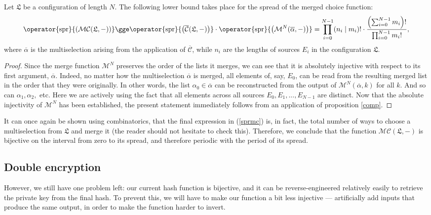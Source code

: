 \documentclass[12pt, a4paper]{article}
\renewcommand{\C}{\mathcal{C}}
\newcommand{\CC}{\overline{\mathcal{C}}}
\newcommand{\M}{\mathcal{M}}
\newcommand{\conf}{\mathfrak{L}}
\newcommand{\spr}[1]{\operator{\mathrm{spr}}{\left(#1\right)}}
\begin{document}
\begin{proposition}
    Let $ \conf $ be a configuration of length $ N $. The following lower bound takes place for the spread of the merged choice function:
    \begin{equation}\label{sprmc}
        \spr{\M\C(\conf, -)} \gge \spr{\CC(\conf, -)} \cdot \spr{\M^N(\overline{\alpha}, -)} = \prod\limits_{i = 0}^{N-1} (n_i \mid m_i)! \cdot \frac{\left( \sum\nolimits_{i = 0}^{N-1} m_i \right)!}{\prod\nolimits_{i = 0}^{N-1} m_i!},
    \end{equation}
    where $ \overline{\alpha} $ is the multiselection arising from the application of $ \CC $, while $ n_i $ are the lengths of sources $ E_i $ in the configuration $ \conf $.
\end{proposition}
\begin{proof}
    Since the merge function $ \M^N $ preserves the order of the lists it merges, we can see that it is absolutely injective with respect to its first argument, $ \overline{\alpha} $. Indeed, no matter how the multiselection $ \overline{\alpha} $ is merged, all elements of, say, $ E_0 $, can be read from the resulting merged list in the order that they were originally. In other words, the list $ \alpha_0 \in \overline{\alpha} $ can be reconstructed from the output of $ \M^N(\overline{\alpha}, k) $ for all $ k $. And so can $ \alpha_1, \alpha_2, $ etc. Here we are actively using the fact that all elements across all sources $ E_0, E_1, ..., E_{N-1} $ are distinct. Now that the absolute injectivity of $ \M^N $ has been established, the present statement immediately follows from an application of proposition \ref{comp}.
\end{proof}

It can once again be shown using combinatorics, that the final expression in (\ref{sprmc}) is, in fact, the total number of ways to choose a multiselection from $ \conf $ and merge it (the reader should not hesitate to check this). Therefore, we conclude that the function $ \M\C(\conf, -) $ is bijective on the interval from zero to its spread, and therefore periodic with the period of its spread.

\subsection{Double encryption}

However, we still have one problem left: our current hash function is bijective, and it can be reverse-engineered relatively easily to retrieve the private key from the final hash. To prevent this, we will have to make our function a bit less injective --- artificially add inputs that produce the same output, in order to make the function harder to invert.
\end{document}
